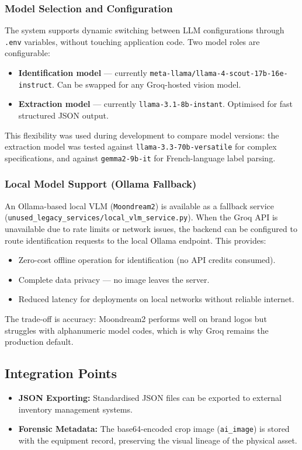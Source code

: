 \subsubsection{Model Selection and Configuration}
The system supports dynamic switching between LLM configurations through \texttt{.env} variables, without touching application code. Two model roles are configurable:
\begin{itemize}
  \item \textbf{Identification model} — currently \texttt{meta-llama/llama-4-scout-17b-16e-instruct}. Can be swapped for any Groq-hosted vision model.
  \item \textbf{Extraction model} — currently \texttt{llama-3.1-8b-instant}. Optimised for fast structured JSON output.
\end{itemize}
This flexibility was used during development to compare model versions: the extraction model was tested against \texttt{llama-3.3-70b-versatile} for complex specifications, and against \texttt{gemma2-9b-it} for French-language label parsing.

\subsubsection{Local Model Support (Ollama Fallback)}
An Ollama-based local VLM (\texttt{Moondream2}) is available as a fallback service (\texttt{unused\_legacy\_services/local\_vlm\_service.py}). When the Groq API is unavailable due to rate limits or network issues, the backend can be configured to route identification requests to the local Ollama endpoint. This provides:
\begin{itemize}
  \item Zero-cost offline operation for identification (no API credits consumed).
  \item Complete data privacy — no image leaves the server.
  \item Reduced latency for deployments on local networks without reliable internet.
\end{itemize}
The trade-off is accuracy: Moondream2 performs well on brand logos but struggles with alphanumeric model codes, which is why Groq remains the production default.

\subsection{Integration Points}

\begin{itemize}
  \item \textbf{JSON Exporting:} Standardised JSON files can be exported to external inventory management systems.
  \item \textbf{Forensic Metadata:} The base64-encoded crop image (\texttt{ai\_image}) is stored with the equipment record, preserving the visual lineage of the physical asset.
\end{itemize}

